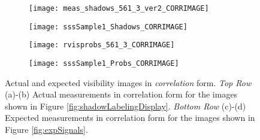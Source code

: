 \begin{figure}[!h]
	\centering
	\begin{subfigure}[b]{0.54\textwidth}
                \texttt{[image: meas\_shadows\_561\_3\_ver2\_CORRIMAGE]}
                \caption{}
  	\end{subfigure}
  	\hspace{8ex}
  	\centering
	\begin{subfigure}[b]{0.314\textwidth}
                \texttt{[image: sssSample1\_Shadows\_CORRIMAGE]}
                \caption{}
  	\end{subfigure}
  	
	\centering
	\begin{subfigure}[b]{0.54\textwidth}
                \texttt{[image: rvisprobs\_561\_3\_CORRIMAGE]}
                \caption{}
  	\end{subfigure}
 	\hspace{8ex}
  	\centering
	\begin{subfigure}[b]{0.314\textwidth}
                \texttt{[image: sssSample1\_Probs\_CORRIMAGE]}
                \caption{}
  	\end{subfigure}	
	\caption{Actual and expected visibility images in \emph{correlation} form. \emph{Top Row} (a)-(b) Actual measurements in correlation form for the images shown in Figure \ref{fig:shadowLabelingDisplay}. \emph{Bottom Row} (c)-(d) Expected measurements in correlation form for the images shown in Figure \ref{fig:expSignals}. }	
	\label{fig:measCORR}
\end{figure}

